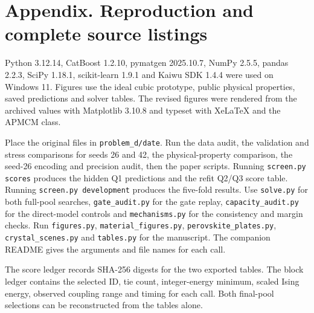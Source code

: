 \clearpage
\section*{Appendix. Reproduction and complete source listings}
{}
Python 3.12.14, CatBoost 1.2.10, pymatgen 2025.10.7, NumPy 2.5.5, pandas 2.2.3, SciPy 1.18.1, scikit-learn 1.9.1 and Kaiwu SDK 1.4.4 were used on Windows 11. Figures use the ideal cubic prototype, public physical properties, saved predictions and solver tables. The revised figures were rendered from the archived values with Matplotlib 3.10.8 and typeset with XeLaTeX and the APMCM class.

Place the original files in \texttt{problem\_d/date}. Run the data audit, the validation and stress comparisons for seeds 26 and 42, the physical-property comparison, the seed-26 encoding and precision audit, then the paper scripts. Running \texttt{screen.py scores} produces the hidden Q1 predictions and the refit Q2/Q3 score table. Running \texttt{screen.py development} produces the five-fold results. Use \texttt{solve.py} for both full-pool searches, \texttt{gate\_audit.py} for the gate replay, \texttt{capacity\_audit.py} for the direct-model controls and \texttt{mechanisms.py} for the consistency and margin checks. Run \texttt{figures.py}, \texttt{material\_figures.py}, \texttt{perovskite\_plates.py}, \texttt{crystal\_scenes.py} and \texttt{tables.py} for the manuscript. The companion README gives the arguments and file names for each call.

The score ledger records SHA-256 digests for the two exported tables. The block ledger contains the selected ID, tie count, integer-energy minimum, scaled Ising energy, observed coupling range and timing for each call. Both final-pool selections can be reconstructed from the tables alone.

